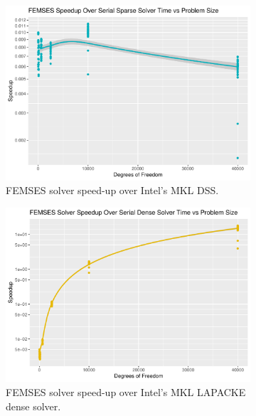 \begin{figure}
	\centering
	\begin{subfigure}{0.48\linewidth}
		\centering
		\includegraphics[width = \linewidth]{Plots/solve_femses_sparse_cpu_speedup_vs_n}
		\caption{FEMSES solver speed-up over Intel's MKL DSS.}
		\label{fig:solve_femses_sparse}
	\end{subfigure}\hfill
	\begin{subfigure}{0.48\linewidth}
		\centering
		\includegraphics[width=\linewidth]{Plots/solve_femses_dense_cpu_speedup_vs_n}
		\caption{FEMSES solver speed-up over Intel's MKL LAPACKE dense solver.}
		\label{fig:solve_femses_dense}
	\end{subfigure}\\
	\begin{subfigure}{0.48\linewidth}

\end{subfigure}
\end{figure}

